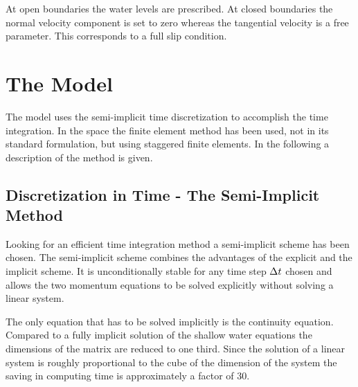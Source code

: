 At open boundaries the water levels are prescribed. At closed boundaries
the normal velocity component is set to zero whereas the tangential velocity
is a free parameter. This corresponds to a full slip condition.







\section{The Model}

The model uses the semi-implicit time discretization to accomplish
the time integration. In the space the finite element method has
been used, not in its standard formulation, but using staggered finite
elements. In the following a description of the method is given.






\subsection{Discretization in Time - The Semi-Implicit Method}

Looking for an efficient time integration method
a semi-implicit scheme has been chosen.
The semi-implicit scheme combines the advantages of
the explicit and the implicit scheme. It is unconditionally stable for any
time step $\mbox{$\Delta t$}$ chosen and allows the two momentum equations to be
solved explicitly without solving a linear system. 

The only equation
that has to be solved implicitly is the continuity equation. Compared
to a fully implicit solution of the shallow water equations the dimensions
of the matrix are reduced to one third. Since the solution of a linear
system is roughly proportional to the cube of the dimension of the system
the saving in computing time is approximately a factor of 30.

